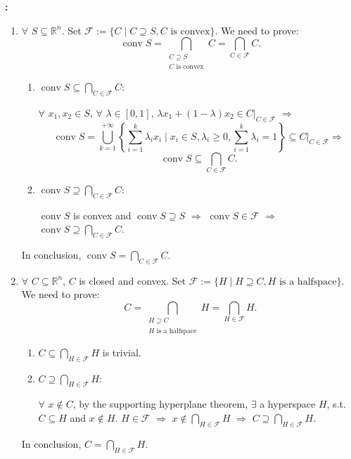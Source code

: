 \documentclass[11pt,letter,notitlepage]{article}
\theoremstyle{definition}
\begin{document}
\newpage
\begin{solution}\textbf{:}
\begin{enumerate}
    \item[(a)] $\forall$ $S \subseteq \mathbb{R}^n$. Set $\mathcal{F} := \{C \mid C \supseteq S, C \text{ is convex}\}$. We need to prove:
    $$
    \operatorname{conv} S = \bigcap_{\substack{C \supseteq S \\ C \text{ is convex}}} C = \bigcap_{C \in \mathcal{F}} C.
    $$
    \begin{enumerate}
        \item[\ding{172}] $\operatorname{conv} S \subseteq \bigcap_{C \in \mathcal{F}} C$:
        
        $\forall$ $x_1, x_2\in S$, $\forall$ $\lambda \in [0,1]$, $\lambda x_1 + (1-\lambda) x_2 \in C|_{C \in \mathcal{F}}$ $\Longrightarrow$ 
        $$\operatorname{conv} S = \bigcup_{k=1}^{+\infty} \left\{\sum_{i=1}^k \lambda_i x_i \mid x_i \in S, \lambda_i \ge 0, \sum_{i=1}^k \lambda_i = 1\right\} \subseteq C|_{C \in \mathcal{F}}
        \Longrightarrow
        $$
        $$
        \operatorname{conv} S \subseteq \bigcap_{C \in \mathcal{F}} C.
        $$
        \item[\ding{173}] $\operatorname{conv} S \supseteq \bigcap_{C \in \mathcal{F}} C$:
        
        $\operatorname{conv} S$ is convex and $\operatorname{conv} S \supseteq S$ $\Longrightarrow$ $\operatorname{conv} S \in \mathcal{F}$ $\Longrightarrow$ $\operatorname{conv} S \supseteq \bigcap_{C \in \mathcal{F}} C$.
    \end{enumerate}
    In conclusion, $\operatorname{conv} S = \bigcap_{C \in \mathcal{F}} C$.
    \item[(b)] $\forall$ $C \subseteq \mathbb{R}^n$, $C$ is closed and convex. Set $\mathcal{F} := \{H \mid H \supseteq C, H \text{ is a halfspace}\}$. We need to prove:
    $$
    C = \bigcap_{\substack{H \supseteq C \\ H \text{ is a halfspace}}} H = \bigcap_{H \in \mathcal{F}} H.
    $$
    \begin{enumerate}
        \item[\ding{172}] $C \subseteq \bigcap_{H \in \mathcal{F}} H$ is trivial.
        \item[\ding{173}] $C \supseteq \bigcap_{H \in \mathcal{F}} H$:
        
        $\forall$ $x \not\in C$, by the supporting hyperplane theorem, $\exists$ a hyperspace $H$, s.t. $C \subseteq H$ and $x \not\in H$. $H \in \mathcal{F}$ $\Longrightarrow$ $x \not\in \bigcap_{H \in \mathcal{F}} H$ $\Longrightarrow$ $C \supseteq \bigcap_{H \in \mathcal{F}} H$.
    \end{enumerate}
    In conclusion, $C = \bigcap_{H \in \mathcal{F}} H$.
\end{enumerate}
\end{solution}
\end{document}

